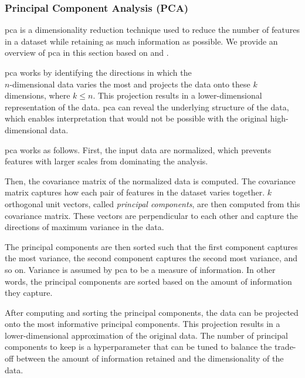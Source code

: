 \subsubsection{Principal Component Analysis (PCA)}\label{subsec:pca}
\gls{pca} is a dimensionality reduction technique used to reduce the number of features in a dataset while retaining as much information as possible.
We provide an overview of \gls{pca} in this section based on \citet{dataminingConcepts} and \citet{Vasques2024}.

\gls{pca} works by identifying the directions in which the\\$n$-dimensional data varies the most and projects the data onto these $k$ dimensions, where $k \leq n$.
This projection results in a lower-dimensional representation of the data.
\gls{pca} can reveal the underlying structure of the data, which enables interpretation that would not be possible with the original high-dimensional data.

\gls{pca} works as follows.
First, the input data are normalized, which prevents features with larger scales from dominating the analysis.

Then, the covariance matrix of the normalized data is computed.
The covariance matrix captures how each pair of features in the dataset varies together.
$k$ orthogonal unit vectors, called \textit{principal components}, are then computed from this covariance matrix.
These vectors are perpendicular to each other and capture the directions of maximum variance in the data.

The principal components are then sorted such that the first component captures the most variance, the second component captures the second most variance, and so on.
Variance is assumed by \gls{pca} to be a measure of information.
In other words, the principal components are sorted based on the amount of information they capture.

After computing and sorting the principal components, the data can be projected onto the most informative principal components.
This projection results in a lower-dimensional approximation of the original data.
The number of principal components to keep is a hyperparameter that can be tuned to balance the trade-off between the amount of information retained and the dimensionality of the data.
